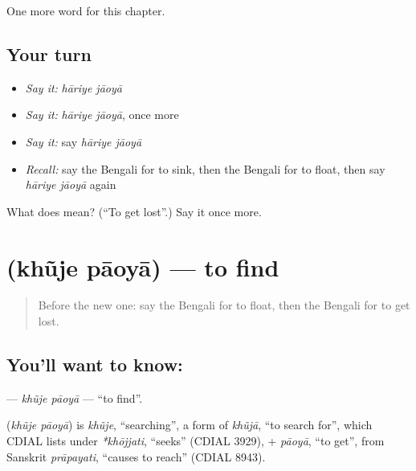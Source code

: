 \begin{grammarlens}[title={What you've built}]
One more word for this chapter.
\end{grammarlens}

\subsection*{Your turn}
\begin{itemize}
\raggedright
  \item \emph{Say it:} \emph{hāriye jāoyā}
  \item \emph{Say it:} \emph{hāriye jāoyā}, once more
  \item \emph{Say it:} say \emph{hāriye jāoyā}
  \item \emph{Recall:} say the Bengali for to sink, then the Bengali for to float, then say \emph{hāriye jāoyā} again
\end{itemize}

\begin{tcolorbox}[breakable,colback=teal!4,colframe=teal!35!black,title={Before you move on}]
What does   mean? (\textquotedblleft{}To get lost\textquotedblright{}.) Say it once more.
\end{tcolorbox}
\section[\texorpdfstring{\bn{খুঁজে} \bn{পাওয়া} (khũje pāoyā)}{খুঁজে পাওয়া (khũje pāoyā)}]{  (khũje pāoyā) — to find}

\label{lesson:BN-C241-khuje-paoya}



\begin{quote}
Before the new one: say the Bengali for to float, then the Bengali for to get lost.
\end{quote}

\subsection*{You'll want to know:  }
\textbf{ } — \emph{khũje pāoyā} — \textquotedblleft{}to find\textquotedblright{}.

\begin{cousinweb}
\textbf{ } (\emph{khũje pāoyā}) is \emph{khũje}, \textquotedblleft{}searching\textquotedblright{}, a form of \emph{khũjā}, \textquotedblleft{}to search for\textquotedblright{}, which CDIAL lists under \emph{*khōjjati}, \textquotedblleft{}seeks\textquotedblright{} (CDIAL 3929), + \emph{pāoyā}, \textquotedblleft{}to get\textquotedblright{}, from Sanskrit \emph{prāpayati}, \textquotedblleft{}causes to reach\textquotedblright{} (CDIAL 8943).
\end{cousinweb}

